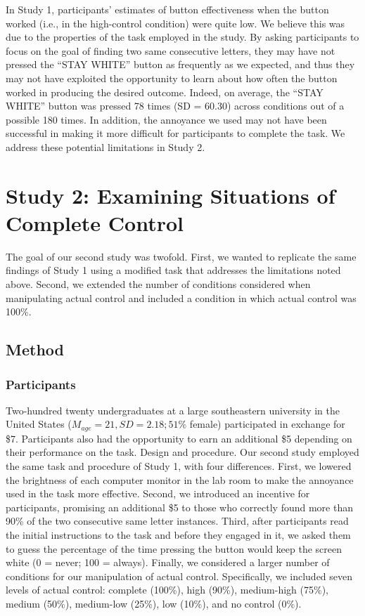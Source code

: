 \documentclass[USenglish,letterpaper,12pt,extrafontsizes,oneside,onecolumn,final]{memoir}
\begin{document}
In Study 1, participants' estimates of button effectiveness when the button worked (i.e., in the high-control condition) were quite low. We believe this was due to the properties of the task employed in the study. By asking participants to focus on the goal of finding two same consecutive letters, they may have not pressed the ``STAY WHITE'' button as frequently as we expected, and thus they may not have exploited the opportunity to learn about how often the button worked in producing the desired outcome. Indeed, on average, the ``STAY WHITE'' button was pressed 78 times (SD = 60.30) across conditions out of a possible 180 times. In addition, the annoyance we used may not have been successful in making it more difficult for participants to complete the task. We address these potential limitations in Study 2.

\section{Study 2: Examining Situations of Complete Control}
The goal of our second study was twofold. First, we wanted to replicate the same findings of Study 1 using a modified task that addresses the limitations noted above. Second, we extended the number of conditions considered when manipulating actual control and included a condition in which actual control was 100\%.

\subsection{Method}
\subsubsection{Participants}
Two-hundred twenty undergraduates at a large southeastern university in the United States ($M_{age} = 21, SD = 2.18; 51\%$ female) participated in exchange for \$7. Participants also had the opportunity to earn an additional \$5 depending on their performance on the task.	
Design and procedure. Our second study employed the same task and procedure of Study 1, with four differences. First, we lowered the brightness of each computer monitor in the lab room to make the annoyance used in the task more effective. Second, we introduced an incentive for participants, promising an additional \$5 to those who correctly found more than 90\% of the two consecutive same letter instances. Third, after participants read the initial instructions to the task and before they engaged in it, we asked them to guess the percentage of the time pressing the button would keep the screen white (0 = never; 100 = always). Finally, we considered a larger number of conditions for our manipulation of actual control. Specifically, we included seven levels of actual control: complete (100\%), high (90\%), medium-high (75\%), medium (50\%), medium-low (25\%), low (10\%), and no control (0\%).
\end{document}
